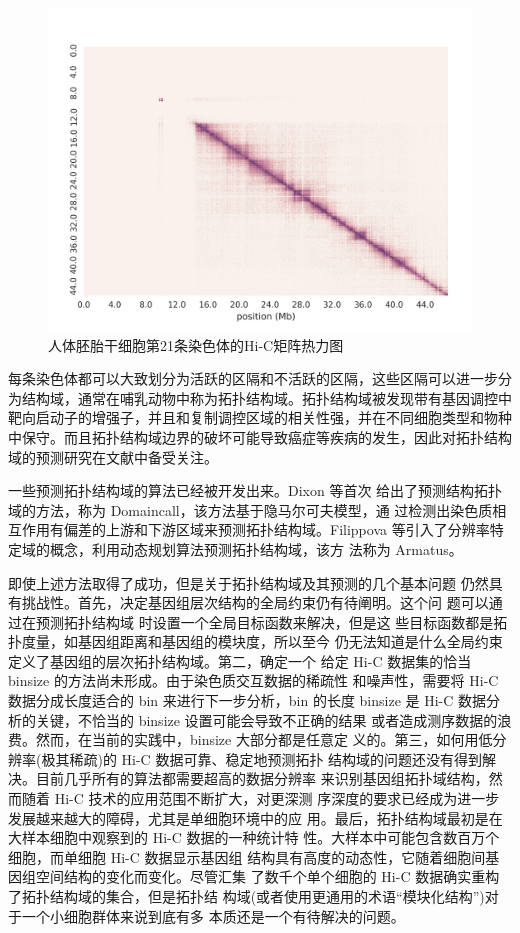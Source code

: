 \documentclass[a4paper]{apa6}
\begin{document}
\begin{figure}[htbp]
\centering
\includegraphics[width=.9\linewidth]{./asset/hic-heatmap.png}
\caption{\label{fig:hic-heatmap}人体胚胎干细胞第21条染色体的Hi-C矩阵热力图}
\end{figure}

每条染色体都可以大致划分为活跃的区隔和不活跃的区隔，这些区隔可以进一步分为结构域，通常在哺乳动物中称为拓扑结构域。拓扑结构域被发现带有基因调控中靶向启动子的增强子，并且和复制调控区域的相关性强，并在不同细胞类型和物种中保守。而且拓扑结构域边界的破坏可能导致癌症等疾病的发生，因此对拓扑结构域的预测研究在文献中备受关注。

一些预测拓扑结构域的算法已经被开发出来。Dixon 等\citep{dixon2012topological}首次 给出了预测结构拓扑域的方法，称为 Domaincall，该方法基于隐马尔可夫模型，通 过检测出染色质相互作用有偏差的上游和下游区域来预测拓扑结构域。Filippova 等\citep{filippova2014identification}引入了分辨率特定域的概念，利用动态规划算法预测拓扑结构域，该方 法称为 Armatus。

即使上述方法取得了成功，但是关于拓扑结构域及其预测的几个基本问题 仍然具有挑战性。首先，决定基因组层次结构的全局约束仍有待阐明。这个问 题可以通过在预测拓扑结构域 时设置一个全局目标函数来解决，但是这 些目标函数都是拓扑度量，如基因组距离和基因组的模块度，所以至今 仍无法知道是什么全局约束定义了基因组的层次拓扑结构域。第二，确定一个 给定 Hi-C 数据集的恰当 binsize 的方法尚未形成。由于染色质交互数据的稀疏性 和噪声性，需要将 Hi-C 数据分成长度适合的 bin 来进行下一步分析，bin 的长度 binsize 是 Hi-C 数据分析的关键，不恰当的 binsize 设置可能会导致不正确的结果 或者造成测序数据的浪费。然而，在当前的实践中，binsize 大部分都是任意定 义的。第三，如何用低分辨率(极其稀疏)的 Hi-C 数据可靠、稳定地预测拓扑 结构域的问题还没有得到解决。目前几乎所有的算法都需要超高的数据分辨率 来识别基因组拓扑域结构，然而随着 Hi-C 技术的应用范围不断扩大，对更深测 序深度的要求已经成为进一步发展越来越大的障碍，尤其是单细胞环境中的应 用。最后，拓扑结构域最初是在大样本细胞中观察到的 Hi-C 数据的一种统计特 性。大样本中可能包含数百万个细胞，而单细胞 Hi-C 数据显示基因组 结构具有高度的动态性，它随着细胞间基因组空间结构的变化而变化。尽管汇集 了数千个单个细胞的 Hi-C 数据确实重构了拓扑结构域的集合，但是拓扑结 构域(或者使用更通用的术语“模块化结构”)对于一个小细胞群体来说到底有多 本质还是一个有待解决的问题。
\end{document}

